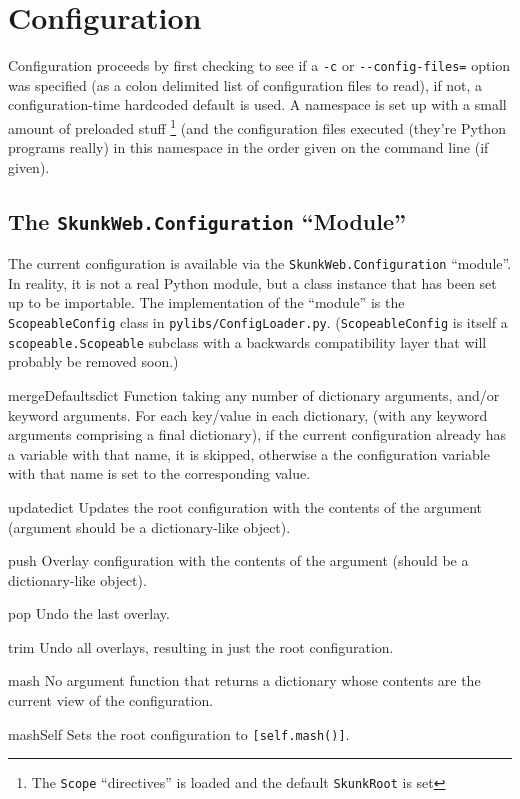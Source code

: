 \documentclass{manual}
\begin{document}
\section{Configuration}
Configuration proceeds by first checking to see if a \verb!-c! or
\verb!--config-files=! option was specified (as a colon delimited list
of configuration files to read), if not, a configuration-time
hardcoded default is used.  A namespace is set up with a small amount
of preloaded stuff \footnote{The \texttt{Scope} ``directives'' is loaded and the default \texttt{SkunkRoot} is set}
(and the configuration files executed (they're
Python programs really) in this namespace in the order given on the
command line (if given).

\subsection{The \texttt{SkunkWeb.Configuration} ``Module''}

The current configuration is available via the
\texttt{SkunkWeb.Configuration} ``module''.  In reality, it is not a
real Python module, but a class instance that has been set up to be
importable.  The implementation of the ``module'' is the
\texttt{ScopeableConfig} class in  \verb!pylibs/ConfigLoader.py!.
(\texttt{ScopeableConfig} is itself a \texttt{scopeable.Scopeable} subclass
with a backwards compatibility layer that will probably be removed soon.)

\begin{methoddesc}{mergeDefaults}{dict} Function taking any number of dictionary
arguments, and/or keyword arguments. For each key/value in each dictionary, (with 
any keyword arguments comprising a final dictionary), if the current
configuration already has a variable with that name, it is skipped,
otherwise a the configuration variable with that name is set to the
corresponding value. 
\end{methoddesc}

\begin{methoddesc}{update}{dict} Updates the root configuration with the
contents of the argument (argument should be a dictionary-like
object). 
\end{methoddesc}
\begin{methoddesc}{push}{} Overlay configuration with the contents
of the argument (should be a dictionary-like object). 
\end{methoddesc}
\begin{methoddesc}{pop}{} Undo the last overlay.
\end{methoddesc}
\begin{methoddesc}{trim}{} Undo all overlays, resulting in just the
root configuration. 
\end{methoddesc}
\begin{methoddesc}{mash}{} No argument function that returns a
dictionary whose contents are the current view of the configuration.
\end{methoddesc}
\begin{methoddesc}{mashSelf}{} Sets the root configuration to
\verb![self.mash()]!. 
\end{methoddesc}
\end{document}
